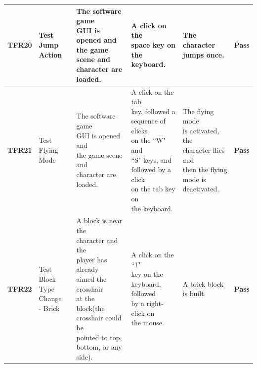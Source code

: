\documentclass[12pt, titlepage]{article}
\begin{document}
\begin{center}
\begin{longtable}[!bpht]{|m{1.3cm}|m{2.3cm}|m{3.4cm}|m{3.4cm}|m{3.4cm}|m{1cm}|}
\textbf{TFR20} & \makecell[ml]{Test Jump\\ Action} & \makecell[ml]{The software game\\ GUI is opened and\\ the game scene and\\ character are\\ loaded.} & \makecell[ml]{A click on the\\ space key on the\\ keyboard.} & \makecell[ml]{The character\\ jumps once.} & \textbf{Pass}\\\hline

\textbf{TFR21} & \makecell[ml]{Test\\ Flying Mode} & \makecell[ml]{The software game\\ GUI is opened and\\ the game scene and\\ character are\\ loaded.} & \makecell[ml]{A click on the tab\\ key, followed a\\ sequence of clicks\\ on the ``W" and\\ ``S" keys, and\\ followed by a click\\ on the tab key on\\ the keyboard.} & \makecell[ml]{The flying mode\\ is activated, the\\ character flies and\\ then the flying\\ mode is\\ deactivated.} & \textbf{Pass}\\\hline

\textbf{TFR22} & \makecell[ml]{Test Block\\ Type Change\\ - Brick} & \makecell[ml]{A block is near the\\ character and the\\ player has already\\ aimed the crosshair\\ at the block(the\\ crosshair could be\\ pointed to top,\\ bottom, or any\\ side).} & \makecell[ml]{A click on the ``1"\\ key on the\\ keyboard, followed\\ by a right-click on\\ the mouse.} & \makecell[ml]{A brick block\\ is built.} & \textbf{Pass}\\\hline


\end{longtable}
\end{center}
\end{document}
